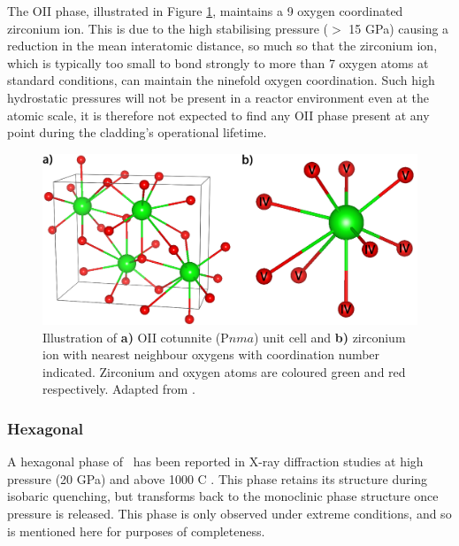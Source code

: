 The OII phase, illustrated in Figure \ref{fig:cotunnite_structure}, maintains a 9 oxygen coordinated zirconium ion. This is due to the high stabilising pressure ($>$ 15 GPa) causing a reduction in the mean interatomic distance, so much so that the zirconium ion, which is typically too small to bond strongly to more than 7 oxygen atoms at standard conditions, can maintain the ninefold oxygen coordination. Such high hydrostatic pressures will not be present in a reactor environment even at the atomic scale, it is therefore not expected to find any OII phase present at any point during the cladding's operational lifetime.

\begin{figure}[ht]
  \centering
      \includegraphics[width=\linewidth]{images/cotunnite_lex.png}
  \caption[Illustration of \textbf{a)} OII cotunnite (P$nma$) unit cell and \textbf{b)} zirconium ion with nearest neighbour oxygens with coordination number indicated. Zirconium and oxygen ions are shaded dark and light respectively.]{Illustration of \textbf{a)} OII cotunnite (P$nma$) unit cell and \textbf{b)} zirconium ion with nearest neighbour oxygens with coordination number indicated. Zirconium and oxygen atoms are coloured green and red respectively. Adapted from \cite{Haines1997}.}
  \label{fig:cotunnite_structure}
\end{figure}

\subsubsection{Hexagonal}

A hexagonal phase of \zirconia\ has been reported in X-ray diffraction studies at high pressure (20 GPa) and above 1000 \textdegree C \cite{ohtaka1994new}. This phase retains its structure during isobaric quenching, but transforms back to the monoclinic phase structure once pressure is released. This phase is only observed under extreme conditions, and so is mentioned here for purposes of completeness.

